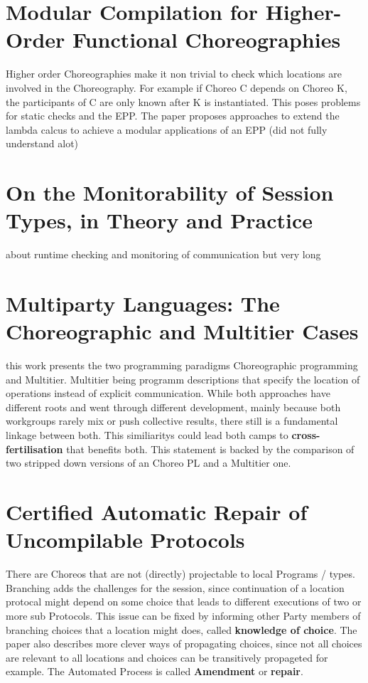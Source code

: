 \documentclass[
	ngerman,
	ruledheaders=section,%
	class=report,%
	thesis={type=master},%
	accentcolor=9c,%
	custommargins=true,%
	marginpar=false,%
	parskip=half-,%
	fontsize=11pt,%
]{tudapub}
\begin{document}
\section{Modular Compilation for Higher-Order Functional
Choreographies}
Higher order Choreographies make it non trivial to check which locations are involved in the Choreography. For example if Choreo C depends on Choreo K, the participants of C are only known after K is instantiated. This poses problems for static checks and the EPP. The paper proposes approaches to extend the lambda calcus to achieve a modular applications of an EPP (did not fully understand alot)

\section{On the Monitorability of Session Types, in Theory
and Practice}
about runtime checking and monitoring of communication but very long

\section{Multiparty Languages: The Choreographic and
Multitier Cases}

this work presents the two programming paradigms Choreographic programming and Multitier. Multitier being programm descriptions that specify the location of operations instead of explicit communication. While both approaches have different roots and went through different development, mainly because both workgroups rarely mix or push collective results, there still is a fundamental linkage between both. This similiaritys could lead both camps to \textbf{cross-fertilisation} that benefits both. This statement is backed by the comparison of two stripped down versions of an Choreo PL and a Multitier one.

\section{Certified Automatic Repair of Uncompilable Protocols}
There are Choreos that are not (directly) projectable to local Programs / types. Branching adds the challenges for the session, since continuation of a location protocal might depend on some choice that leads to different executions of two or more sub Protocols. This issue can be fixed by informing other Party members of branching choices that a location might does, called \textbf{knowledge of choice}. The paper also describes more clever ways of propagating choices, since not all choices are relevant to all locations and choices can be transitively propageted for example. The Automated Process is called \textbf{Amendment} or \textbf{repair}.
\end{document}

